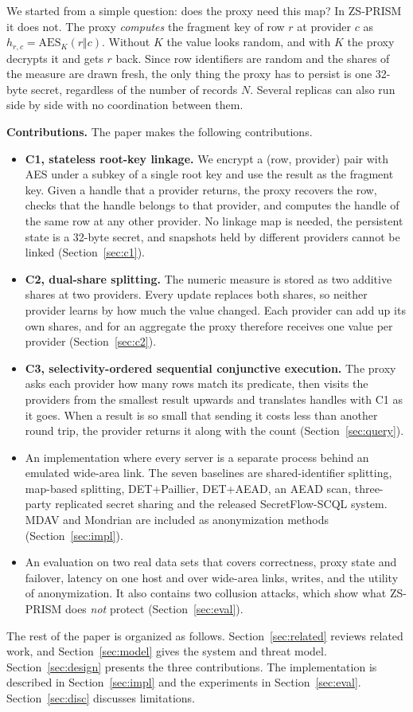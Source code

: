 \documentclass[conference]{IEEEtran}
\newcommand{\sys}{ZS-PRISM}
\begin{document}
We started from a simple question: does the proxy need this map? In \sys{} it does not. The proxy \emph{computes} the fragment key of row $r$ at provider $c$ as $h_{r,c}=\mathrm{AES}_{K}(r\Vert c)$. Without $K$ the value looks random, and with $K$ the proxy decrypts it and gets $r$ back. Since row identifiers are random and the shares of the measure are drawn fresh, the only thing the proxy has to persist is one 32-byte secret, regardless of the number of records $N$. Several replicas can also run side by side with no coordination between them.

\noindent\textbf{Contributions.} The paper makes the following contributions.
\begin{itemize}
  \item \textbf{C1, stateless root-key linkage.} We encrypt a (row, provider) pair with AES under a subkey of a single root key and use the result as the fragment key. Given a handle that a provider returns, the proxy recovers the row, checks that the handle belongs to that provider, and computes the handle of the same row at any other provider. No linkage map is needed, the persistent state is a 32-byte secret, and snapshots held by different providers cannot be linked (Section~\ref{sec:c1}).
  \item \textbf{C2, dual-share splitting.} The numeric measure is stored as two additive shares at two providers. Every update replaces both shares, so neither provider learns by how much the value changed. Each provider can add up its own shares, and for an aggregate the proxy therefore receives one value per provider (Section~\ref{sec:c2}).
  \item \textbf{C3, selectivity-ordered sequential conjunctive execution.} The proxy asks each provider how many rows match its predicate, then visits the providers from the smallest result upwards and translates handles with C1 as it goes. When a result is so small that sending it costs less than another round trip, the provider returns it along with the count (Section~\ref{sec:query}).
  \item An implementation where every server is a separate process behind an emulated wide-area link. The seven baselines are shared-identifier splitting, map-based splitting, DET+Paillier, DET+AEAD, an AEAD scan, three-party replicated secret sharing and the released SecretFlow-SCQL system. MDAV and Mondrian are included as anonymization methods (Section~\ref{sec:impl}).
  \item An evaluation on two real data sets that covers correctness, proxy state and failover, latency on one host and over wide-area links, writes, and the utility of anonymization. It also contains two collusion attacks, which show what \sys{} does \emph{not} protect (Section~\ref{sec:eval}).
\end{itemize}
The rest of the paper is organized as follows. Section~\ref{sec:related} reviews related work, and Section~\ref{sec:model} gives the system and threat model. Section~\ref{sec:design} presents the three contributions. The implementation is described in Section~\ref{sec:impl} and the experiments in Section~\ref{sec:eval}. Section~\ref{sec:disc} discusses limitations.
\end{document}
